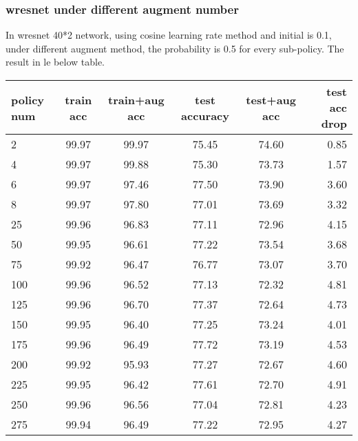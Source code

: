 \subsubsection{wresnet under different augment number}
In wresnet 40*2 network, using cosine learning rate method and initial is 0.1, under different augment method, the probability is 0.5 for every sub-policy. The result in le below table.\\
\begin{tabular}{| l | c | c | c | c | r |}
	\hline
	policy num   & train acc & train+aug acc & test accuracy  &  test+aug acc & test acc drop\\
	\hline
	2          &  99.97   & 99.97       &  75.45         &   74.60            &  0.85\\
	\hline
	4          &  99.97   & 99.88       &  75.30         &   73.73            &  1.57\\
	\hline
	6          &  99.97   & 97.46       &  77.50         &   73.90            &  3.60\\
	\hline
	8          &  99.97   & 97.80       &  77.01         &   73.69            &  3.32\\
	\hline
	25         &  99.96   & 96.83       &  77.11         &   72.96            &  4.15\\
	\hline
	50         &  99.95   & 96.61       &  77.22         &   73.54            &  3.68\\
	\hline
	75         &  99.92   & 96.47       &  76.77         &   73.07            &  3.70\\
	\hline
	100        &  99.96   & 96.52       &  77.13         &   72.32            &  4.81\\
	\hline
	125        &  99.96   & 96.70       &  77.37         &   72.64            &  4.73\\
	\hline
	150        &  99.95   & 96.40       &  77.25         &   73.24            &  4.01\\
	\hline
	175        &  99.96   & 96.49       &  77.72         &   73.19            &  4.53\\
	\hline
	200        &  99.92   & 95.93       &  77.27         &   72.67            &  4.60\\
	\hline
	225        &  99.95   & 96.42       &  77.61         &   72.70            &  4.91\\
	\hline
	250        &  99.96   & 96.56       &  77.04         &   72.81            &  4.23\\
	\hline
	275        &  99.94   & 96.49       &  77.22         &   72.95            &  4.27\\

\end{tabular}
